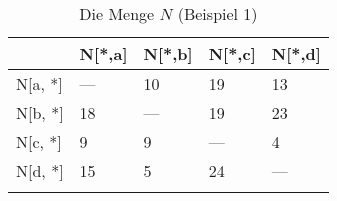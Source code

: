 \begin{longtable}[c]{|l|l|l|l|l|}
\hline
            & N{[}*,a{]} & N{[}*,b{]} & N{[}*,c{]} & N{[}*,d{]} \\ \hline
\endfirsthead
%
\endhead
%
N{[}a, *{]} & ---        & 10         & 19         & 13         \\ \hline
N{[}b, *{]} & 18         & ---        & 19         & 23         \\ \hline
N{[}c, *{]} & 9          & 9          & ---        & 4          \\ \hline
N{[}d, *{]} & 15         & 5          & 24         & ---        \\ \hline
\caption{Die Menge $N$ (Beispiel 1)}
\label{Beispie1_N}\\
\end{longtable}